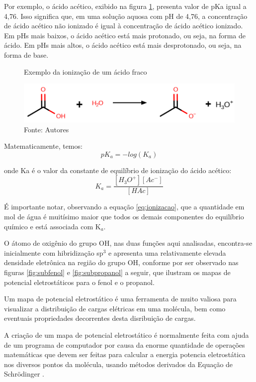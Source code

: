 Por exemplo, o ácido acético, exibido na figura \ref{fig:ionizacao}, presenta valor de pKa igual a 4,76. Isso significa que, em uma solução aquosa com pH de 4,76, a concentração de ácido acético não ionizado é igual à concentração de ácido acético ionizado. Em pHs mais baixos, o ácido acético está mais protonado, ou seja, na forma de ácido. Em pHs mais altos, o ácido acético está mais desprotonado, ou seja, na forma de base.

\begin{figure}[h]
\centering
\caption{Exemplo da ionização de um ácido fraco}
\vspace{0.25cm}
\label{fig:ionizacao}
\includegraphics[width=0.9\linewidth]{imagens/ionizacao.png}
\caption*{Fonte: Autores}
\end{figure}

Matematicamente, temos:
\begin{equation}
	pK_ a = -log(K_ a)
\end{equation}

onde Ka é o valor da constante de equilíbrio de ionização do ácido acético:
\begin{equation}
	K_a = \frac{{\left[ {H_3O^ + } \right]\left[ {Ac^ - } \right]}}{{\left[ {HAc} \right]}}
	\label{eq:ionizacao}
\end{equation}

É importante notar, observando a equação \ref{eq:ionizacao}, que a quantidade em mol de água é muitísimo maior que todos os demais componentes do equilíbrio químico e está associada com K$_a$.

O átomo de oxigênio do grupo OH, nas duas funções aqui analisadas, encontra-se inicialmente com hibridização sp{$^3$} e apresenta uma relativamente elevada densidade eletrônica na região do grupo OH, conforme por ser observado nas figuras \ref{fig:subfenol} e \ref{fig:subpropanol} a seguir, que ilustram os mapas de potencial eletrostáticos para o fenol e o propanol.

Um mapa de potencial eletrostático é uma ferramenta de muito valiosa para visualizar a distribuição de cargas elétricas em uma molécula, bem como eventuais propriedades decorrentes desta disribuição de cargas.

A criação de um mapa de potencial eletrostático é normalmente feita com ajuda de um programa de computador por causa da enorme quantidade de operações matemáticas que devem ser feitas para calcular a energia potencia eletrostática nos diversos pontos da molécula, usando métodos derivados da Equação de Schrödinger \cite{Schrodinger}.

